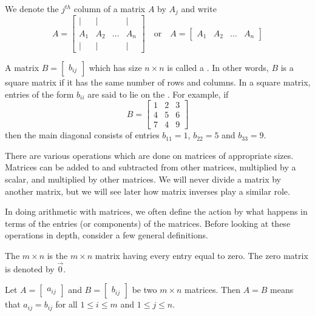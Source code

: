 \documentclass{ximera}
\begin{document}
We denote the $j^{th}$ column of a matrix $A$ 
by $A_{j}$ and write
$$A=\begin{bmatrix}|&|&&|\\A_1& A_2 &\ldots & A_n\\|&|&&|\end{bmatrix}\quad\text{or}\quad A=\begin{bmatrix}A_1& A_2 &\ldots & A_n\end{bmatrix}$$

A matrix $B=\begin{bmatrix}b_{ij}\end{bmatrix}$ which has size $n \times n$ is called a . 
In other words, $B$ is a square matrix if it has the same number of rows and columns.  In a square matrix, entries of the form $b_{ii}$ are said to lie on the .  For example, if $$B=\begin{bmatrix}1&2&3\\4&5&6\\7&4&9\end{bmatrix}$$
then the main diagonal consists of entries $b_{11}=1$, $b_{22}=5$ and $b_{33}=9$.

There are various operations which are done on matrices of appropriate 
sizes. Matrices can be added to and subtracted from other matrices,
multiplied by a scalar, and multiplied by other matrices. We will
never divide a matrix by another matrix, but we will see later how matrix inverses play a similar role. 

In doing arithmetic with matrices, we often define the action by what
happens in terms of the entries (or components) of the
matrices. Before looking at these operations in depth, consider a few
general definitions.

\begin{definition}\label{def:zeromatrix}
The $m\times n$  is the $m\times n$ matrix
having every entry equal to zero. The zero matrix is
denoted by $\vec{0}$.
\end{definition}

\begin{definition}\label{def:equalityofmatrices}
 Let $A=\begin{bmatrix} a_{ij}\end{bmatrix}$ and $B=\begin{bmatrix} b_{ij}\end{bmatrix}$ be two $m \times n$ matrices. Then $A=B$ means
that $a_{ij}=b_{ij}$ for all $1\leq i\leq m$ and 
$1\leq j\leq n$.
\end{definition}
\end{document}

